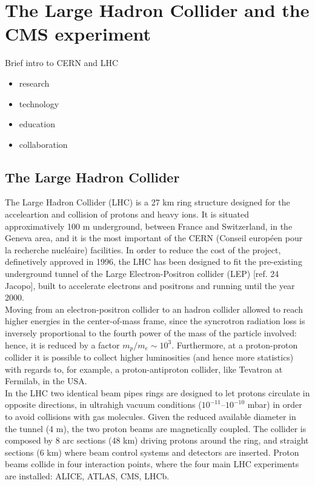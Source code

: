 \chapter{The Large Hadron Collider and the CMS experiment}
\label{chap:LHC_CMS}
Brief intro to CERN and LHC
\begin{itemize}
\item research
\item technology
\item education
\item collaboration
\end{itemize}

\section{The Large Hadron Collider}
The Large Hadron Collider (LHC) is a 27 km ring structure designed for the acceleartion and collision of protons and heavy ions. It is situated approximatively 100 m underground, between France and Switzerland, in the Geneva area, and it is the most important of the CERN (Conseil europ\'een pour la recherche nucl\'eaire) facilities. In order to reduce the cost of the project, definetively approved in 1996, the LHC has been designed to fit the pre-existing underground tunnel of the Large Electron-Positron collider (LEP) [ref. 24 Jacopo], built to accelerate electrons and positrons and running until the year 2000.\\
Moving from an electron-positron collider to an hadron collider allowed to reach higher energies in the center-of-mass frame, since the syncrotron radiation loss is inversely proportional to the fourth power of the mass of the particle involved: hence, it is reduced by a factor $m_p/m_e \sim 10^3$. Furthermore, at a proton-proton collider it is possible to collect higher luminosities (and hence more statistics) with regards to, for example, a proton-antiproton collider, like Tevatron at Fermilab, in the USA.\\
In the LHC two identical beam pipes rings are designed to let protons circulate in opposite directions, in ultrahigh vacuum conditions ($10^{-11}$--$10^{-10}$ mbar) in order to avoid collisions with gas molecules. Given the reduced available diameter in the tunnel (4 m), the two proton beams are magnetically coupled. The collider is composed by 8 arc sections (48 km) driving protons around the ring, and straight sections (6 km) where beam control systems and detectors are inserted. Proton beams collide in four interaction points, where the four main LHC experiments are installed: ALICE, ATLAS, CMS, LHCb.

